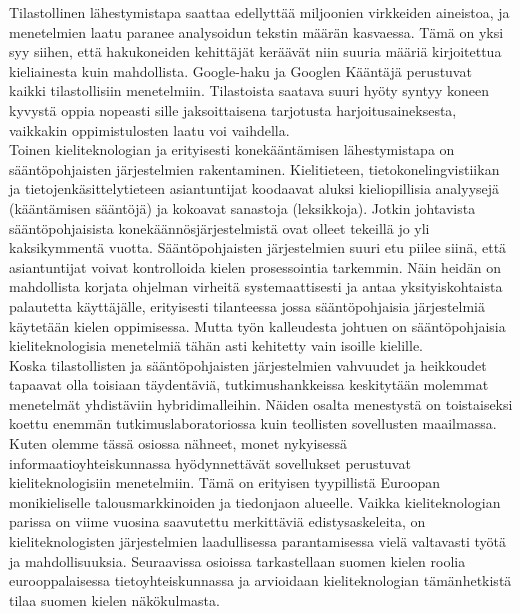\begin{multicols}{2}
Tilastollinen lähestymistapa saattaa edellyttää miljoonien virkkeiden
aineistoa, ja menetelmien laatu paranee analysoidun tekstin määrän kasvaessa.
Tämä on yksi syy siihen, että hakukoneiden kehittäjät keräävät niin suuria
määriä kirjoitettua kieliainesta kuin mahdollista. Google-haku ja Googlen
Kääntäjä perustuvat kaikki tilastollisiin menetelmiin. Tilastoista saatava
suuri hyöty syntyy koneen kyvystä oppia nopeasti sille jaksoittaisena
tarjotusta harjoitusaineksesta, vaikkakin oppimistulosten laatu voi vaihdella.\\
Toinen kieliteknologian ja erityisesti konekääntämisen lähestymistapa on
sääntöpohjaisten järjestelmien rakentaminen. Kielitieteen,
tietokonelingvistiikan ja tietojenkäsittelytieteen asiantuntijat koodaavat
aluksi kieliopillisia analyysejä (kääntämisen sääntöjä) ja kokoavat sanastoja
(leksikkoja). Jotkin johtavista sääntöpohjaisista konekäännösjärjestelmistä
ovat olleet tekeillä jo yli kaksikymmentä vuotta. Sääntöpohjaisten
järjestelmien suuri etu piilee siinä, että asiantuntijat voivat kontrolloida
kielen prosessointia tarkemmin. Näin heidän on mahdollista korjata ohjelman
virheitä systemaattisesti ja antaa yksityiskohtaista palautetta käyttäjälle,
erityisesti tilanteessa jossa sääntöpohjaisia järjestelmiä käytetään kielen
oppimisessa. Mutta työn kalleudesta johtuen on sääntöpohjaisia
kieliteknologisia menetelmiä tähän asti kehitetty vain isoille kielille.\\
Koska tilastollisten ja sääntöpohjaisten järjestelmien vahvuudet ja heikkoudet
tapaavat olla toisiaan täydentäviä, tutkimushankkeissa keskitytään molemmat
menetelmät yhdistäviin hybridimalleihin. Näiden osalta menestystä on
toistaiseksi koettu enemmän tutkimuslaboratoriossa kuin teollisten sovellusten
maailmassa.\\
Kuten olemme tässä osiossa nähneet, monet nykyisessä informaatioyhteiskunnassa
hyödynnettävät sovellukset perustuvat kieliteknologisiin menetelmiin. Tämä on
erityisen tyypillistä Euroopan monikieliselle talousmarkkinoiden ja tiedonjaon
alueelle. Vaikka kieliteknologian parissa on viime vuosina saavutettu
merkittäviä edistysaskeleita, on kieliteknologisten järjestelmien laadullisessa
parantamisessa vielä valtavasti työtä ja mahdollisuuksia. Seuraavissa osioissa
tarkastellaan suomen kielen roolia eurooppalaisessa tietoyhteiskunnassa ja
arvioidaan kieliteknologian tämänhetkistä tilaa suomen kielen näkökulmasta.


\end{multicols}
\clearpage
{}

